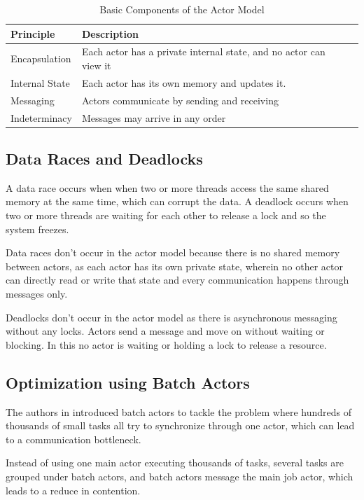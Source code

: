 \begin{table}[!htp]
    \centering
    \caption{Basic Components of the Actor Model}
    \label{tab:actor_model}
    \begin{tabularx}{\textwidth}{|l|X|X|}
        \hline
        \textbf{Principle} & \textbf{Description} \\
        \hline
        Encapsulation & Each actor has a private internal state, and no actor can view it \\
        \hline
        Internal State & Each actor has its own memory and updates it. \\
        \hline
        Messaging & Actors communicate by sending and receiving \\
        \hline
        Indeterminacy & Messages may arrive in any order \\
        \hline
        
    \end{tabularx}
\end{table}

\subsection{Data Races and Deadlocks}
A data race occurs when when two or more threads access the same shared memory at the same time, which can corrupt the data. A deadlock occurs when two or more threads are waiting for each other to release a lock and so the system freezes. 

Data races don't occur in the actor model because there is no shared memory between actors, as each actor has its own private state, wherein no other actor can directly read or write that state and every communication happens through messages only. 

Deadlocks don't occur in the actor model as there is asynchronous messaging without any locks. Actors send a message and move on without waiting or blocking. In this no actor is waiting or holding a lock to release a resource.

\subsection{Optimization using Batch Actors}
The authors in \cite{10820772} introduced batch actors to tackle the problem where hundreds of thousands of small tasks all try to synchronize through one actor, which can lead to a communication bottleneck.

Instead of using one main actor executing thousands of tasks, several tasks are grouped under batch actors, and batch actors message the main job actor, which leads to a reduce in contention. 

